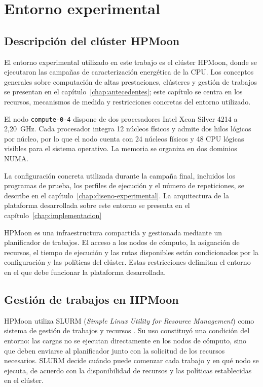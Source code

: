 \chapter{Entorno experimental}
\label{chap:entorno}

\section{Descripción del clúster HPMoon}

El entorno experimental utilizado en este trabajo es el clúster HPMoon, donde se ejecutaron las campañas de caracterización energética de la CPU. Los conceptos generales sobre computación de altas prestaciones, clústeres y gestión de trabajos se presentan en el capítulo~\ref{chap:antecedentes}; este capítulo se centra en los recursos, mecanismos de medida y restricciones concretas del entorno utilizado.

El nodo \texttt{compute-0-4} dispone de dos procesadores Intel Xeon Silver 4214 a 2,20~GHz. Cada procesador integra 12 núcleos físicos y admite dos hilos lógicos por núcleo, por lo que el nodo cuenta con 24 núcleos físicos y 48 CPU lógicas visibles para el sistema operativo. La memoria se organiza en dos dominios NUMA.

La configuración concreta utilizada durante la campaña final, incluidos los programas de prueba, los perfiles de ejecución y el número de repeticiones, se describe en el capítulo~\ref{chap:diseno-experimental}. La arquitectura de la plataforma desarrollada sobre este entorno se presenta en el capítulo~\ref{chap:implementacion}

HPMoon es una infraestructura compartida y gestionada mediante un planificador de trabajos. El acceso a los nodos de cómputo, la asignación de recursos, el tiempo de ejecución y las rutas disponibles están condicionados por la configuración y las políticas del clúster. Estas restricciones delimitan el entorno en el que debe funcionar la plataforma desarrollada.

\section{Gestión de trabajos en HPMoon}
\label{sec:slurm-entorno}

HPMoon utiliza SLURM (\textit{Simple Linux Utility for Resource Management}) como sistema de gestión de trabajos y recursos \parencite{schedmdSlurmQuickstart}. Su uso constituyó una condición del entorno: las cargas no se ejecutan directamente en los nodos de cómputo, sino que deben enviarse al planificador junto con la solicitud de los recursos necesarios. SLURM decide cuándo puede comenzar cada trabajo y en qué nodo se ejecuta, de acuerdo con la disponibilidad de recursos y las políticas establecidas en el clúster.

